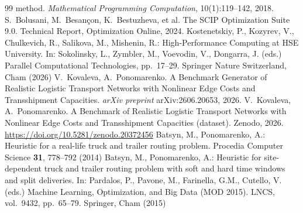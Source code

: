 \documentclass[runningheads]{llncs}
\begin{document}
\begin{thebibliography}{99}
method. \textit{Mathematical Programming Computation}, 10(1):119--142, 2018.
 S.~Bolusani, M.~Besan\c{c}on, K.~Bestuzheva, et al. The SCIP
Optimization Suite 9.0. Technical Report, Optimization Online, 2024.
 Kostenetskiy, P., Kozyrev, V., Chulkevich, R., Salikova, M.,
Mishenin, R.: High-Performance Computing at HSE University. In: Sokolinsky, L.,
Zymbler, M., Voevodin, V., Dongarra, J. (eds.) Parallel Computational
Technologies, pp.~17--29. Springer Nature Switzerland, Cham (2026)
 V.~Kovaleva, A.~Ponomarenko. A Benchmark Generator of
Realistic Logistic Transport Networks with Nonlinear Edge Costs and
Transshipment Capacities. \textit{arXiv preprint} arXiv:2606.20653, 2026.
 V.~Kovaleva, A.~Ponomarenko. A Benchmark of Realistic
Logistic Transport Networks with Nonlinear Edge Costs and Transshipment
Capacities (dataset). Zenodo, 2026. \url{https://doi.org/10.5281/zenodo.20372456}
 Batsyn, M., Ponomarenko, A.: Heuristic for a real-life
truck and trailer routing problem. Procedia Computer Science \textbf{31},
778--792 (2014)
 Batsyn, M., Ponomarenko, A.: Heuristic for
site-dependent truck and trailer routing problem with soft and hard time windows
and split deliveries. In: Pardalos, P., Pavone, M., Farinella, G.M., Cutello, V.
(eds.) Machine Learning, Optimization, and Big Data (MOD 2015). LNCS, vol.~9432,
pp.~65--79. Springer, Cham (2015)
\end{thebibliography}
\end{document}
